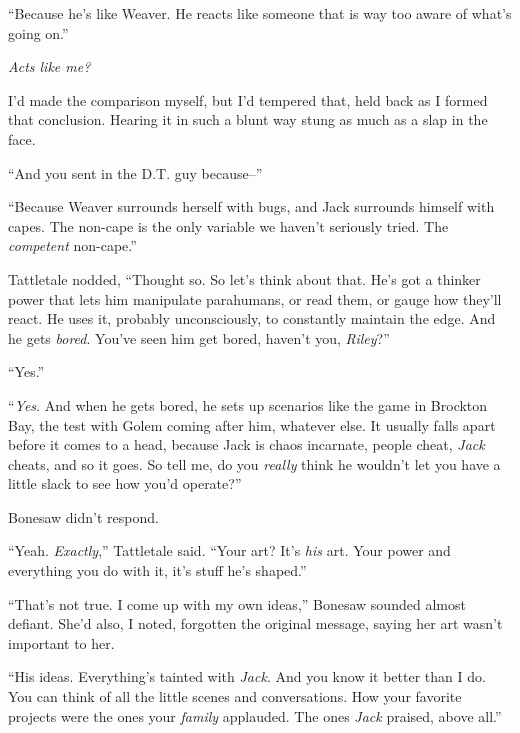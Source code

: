 ``Because he's like Weaver.  He reacts like someone that is way too aware of what's going on.''



\emph{Acts like me?}



I'd made the comparison myself, but I'd tempered that, held back as I formed that conclusion.  Hearing it in such a blunt way stung as much as a slap in the face.



``And you sent in the D.T. guy because--''



``Because Weaver surrounds herself with bugs, and Jack surrounds himself with capes.  The non-cape is the only variable we haven't seriously tried.  The \emph{competent} non-cape.''



Tattletale nodded, ``Thought so.  So let's think about that.  He's got a thinker power that lets him manipulate parahumans, or read them, or gauge how they'll react.  He uses it, probably unconsciously, to constantly maintain the edge.  And he gets \emph{bored}.  You've seen him get bored, haven't you, \emph{Riley}?''



``Yes.''



``\emph{Yes}.  And when he gets bored, he sets up scenarios like the game in Brockton Bay, the test with Golem coming after him, whatever else.  It usually falls apart before it comes to a head, because Jack is chaos incarnate, people cheat, \emph{Jack} cheats, and so it goes.  So tell me, do you \emph{really} think he wouldn't let you have a little slack to see how you'd operate?''



Bonesaw didn't respond.



``Yeah.  \emph{Exactly},'' Tattletale said.  ``Your art?  It's \emph{his} art.  Your power and everything you do with it, it's stuff he's shaped.''



``That's not true.  I come up with my own ideas,'' Bonesaw sounded almost defiant.  She'd also, I noted, forgotten the original message, saying her art wasn't important to her.



``His ideas.  Everything's tainted with \emph{Jack}.  And you know it better than I do.  You can think of all the little scenes and conversations.  How your favorite projects were the ones your \emph{family} applauded.  The ones \emph{Jack} praised, above all.''



